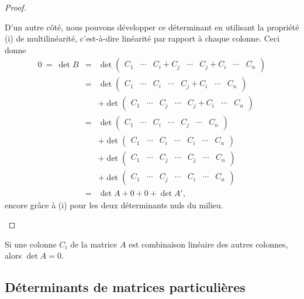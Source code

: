 \documentclass[class=report,crop=false]{standalone}
\begin{document}
\begin{proof}
\begin{enumerate}
D'un autre côté, nous pouvons développer ce déterminant en utilisant
la propriété (i) de multilinéarité, c'est-à-dire linéarité par rapport à chaque colonne.
Ceci donne
\[
\begin{array}{rcl}
0 \ = \ \det B
  & = & \det \begin{pmatrix}C_1&\cdots&C_i+C_j&\cdots&C_j+C_i&\cdots&C_n\end{pmatrix} \\
  & = & \det \begin{pmatrix}C_1&\cdots&C_i&\cdots&C_j+C_i&\cdots&C_n\end{pmatrix} \\
      && +\det\begin{pmatrix}C_1&\cdots&C_j&\cdots&C_j+C_i&\cdots&C_n\end{pmatrix} \\
  &  = & \det \begin{pmatrix}C_1&\cdots&C_i&\cdots&C_j&\cdots&C_n\end{pmatrix} \\
       &&  +\det\begin{pmatrix}C_1&\cdots&C_i&\cdots&C_i&\cdots&C_n\end{pmatrix} \\
  &  & +\det \begin{pmatrix}C_1&\cdots&C_j&\cdots&C_j&\cdots&C_n\end{pmatrix} \\
     &&  +\det\begin{pmatrix}C_1&\cdots&C_j&\cdots&C_i&\cdots&C_n\end{pmatrix} \\
&=&\det A+0+0+\det A',
\end{array}
\]
encore grâce à (i) pour les deux déterminants nuls du milieu.


\end{enumerate}
\end{proof}


\begin{corollaire} \label{coro:colonnes-liees}
Si une colonne $C_i$ de la matrice $A$ est combinaison linéaire
des autres colonnes, alors $\det A=0$.
\end{corollaire}



\subsection{Déterminants de matrices particulières}
\end{document}
